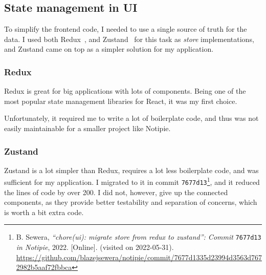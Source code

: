 \subsection{State management in UI}\label{state-management-in-ui}

To simplify the frontend code,
I needed to use a single source of truth for the data.
I used both Redux~\cite{gaeraon_redux_2022},
and Zustand~\cite{kato_zustand_2022} for this task
as \emph{store} implementations,
and Zustand came on top as a simpler solution for my application.

\subsubsection{Redux}\label{redux}

Redux is great for big applications with lots of components.
Being one of the most popular state management libraries for React,
it was my first choice.

Unfortunately,
it required me to write a lot of boilerplate code,
and thus was not easily maintainable
for a smaller project like Notipie.

\subsubsection{Zustand}\label{zustand}

Zustand is a lot simpler than Redux,
requires a lot less boilerplate code,
and was sufficient for my application.
I migrated to it in commit
\texttt{7677d13}\footnote{
  B. Sewera,
  \textit{``chore(ui): migrate store from redux to zustand'': Commit}
  \texttt{7677d13}
  \textit{in Notipie},
  2022.
    [Online]. (visited on 2022-05-31).
  \url{https://github.com/blazejsewera/notipie/commit/7677d1335d23994d3563d7672982b5aaf72fbbca}
},
and it reduced the lines of code by over 200.
I did not, however, give up the connected components,
as they provide better testability and separation of concerns,
which is worth a bit extra code.
